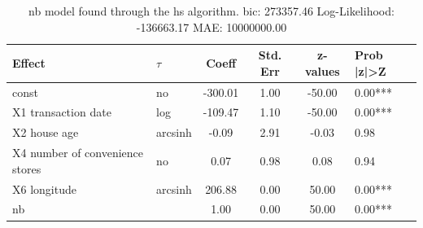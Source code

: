 \begin{table}
	\caption{nb model found through the hs algorithm. bic: 273357.46 Log-Likelihood: -136663.17 MAE: 10000000.00}
	\begin{center}
		\begin{tabular}{|l|l|c|c|c|l|}
			\hline
			Effect & $\tau$ & Coeff & Std. Err & z-values & Prob |z|>Z \\
			\hline
			const & no & -300.01 & 1.00 & -50.00 & 0.00*** \\
			\hline
			X1 transaction date & log & -109.47 & 1.10 & -50.00 & 0.00*** \\
			\hline
			X2 house age & arcsinh & -0.09 & 2.91 & -0.03 & 0.98 \\
			\hline
			X4 number of convenience stores & no & 0.07 & 0.98 & 0.08 & 0.94 \\
			\hline
			X6 longitude & arcsinh & 206.88 & 0.00 & 50.00 & 0.00*** \\
			\hline
			nb &  & 1.00 & 0.00 & 50.00 & 0.00*** \\
			\hline
		\end{tabular}
	\end{center}
\end{table}